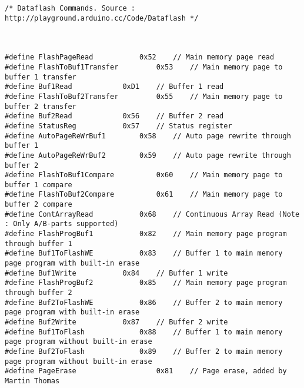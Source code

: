 \begin{lstlisting}[caption=dataflash.h,label=Code2]
/* Dataflash Commands. Source : http://playground.arduino.cc/Code/Dataflash */



#define FlashPageRead			0x52	// Main memory page read
#define FlashToBuf1Transfer 		0x53	// Main memory page to buffer 1 transfer
#define Buf1Read			0xD1	// Buffer 1 read
#define FlashToBuf2Transfer 		0x55	// Main memory page to buffer 2 transfer
#define Buf2Read			0x56	// Buffer 2 read
#define StatusReg			0x57	// Status register
#define AutoPageReWrBuf1		0x58	// Auto page rewrite through buffer 1
#define AutoPageReWrBuf2		0x59	// Auto page rewrite through buffer 2
#define FlashToBuf1Compare    		0x60	// Main memory page to buffer 1 compare
#define FlashToBuf2Compare	    	0x61	// Main memory page to buffer 2 compare
#define ContArrayRead			0x68	// Continuous Array Read (Note : Only A/B-parts supported)
#define FlashProgBuf1			0x82	// Main memory page program through buffer 1
#define Buf1ToFlashWE   		0x83	// Buffer 1 to main memory page program with built-in erase
#define Buf1Write			0x84	// Buffer 1 write
#define FlashProgBuf2			0x85	// Main memory page program through buffer 2
#define Buf2ToFlashWE   		0x86	// Buffer 2 to main memory page program with built-in erase
#define Buf2Write			0x87	// Buffer 2 write
#define Buf1ToFlash     		0x88	// Buffer 1 to main memory page program without built-in erase
#define Buf2ToFlash		        0x89	// Buffer 2 to main memory page program without built-in erase
#define PageErase                   0x81	// Page erase, added by Martin Thomas


\end{lstlisting}
\pagebreak
